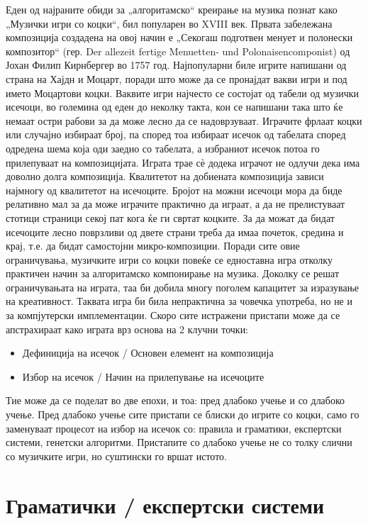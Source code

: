 Еден од најраните обиди за „алгоритамско“ креирање на музика познат како „Музички игри со коцки“, бил популарен во XVIII век. Првата забележана композиција создадена на овој начин е „Секогаш подготвен менует и полонески композитор“ (гер. Der allezeit fertige Menuetten- und Polonaisencomponist) од Јохан Филип Кирнбергер во 1757 год. Најпопуларни биле игрите напишани од страна на Хајдн и Моцарт, поради што може да се пронајдат вакви игри и под името Моцартови коцки. Ваквите игри најчесто се состојат од табели од музички исечоци, во големина од еден до неколку такта, кои се напишани така што ќе немаат остри рабови за да може лесно да се надоврзуваат. Играчите фрлаат коцки или случајно избираат број, па според тоа избираат исечок од табелата според одредена шема која оди заедно со табелата, а избраниот исечок потоа го прилепуваат на композицијата. Играта трае сѐ додека играчот не одлучи дека има доволно долга композиција. Квалитетот на добиената композиција зависи најмногу од квалитетот на исечоците. Бројот на можни исечоци мора да биде релативно мал за да може играчите практично да играат, а да не прелистуваат стотици страници секој пат кога ќе ги свртат коцките. За да можат да бидат исечоците лесно поврзливи од двете страни треба да имаа почеток, средина и крај, т.е. да бидат самостојни микро-композиции. Поради сите овие ограничувања, музичките игри со коцки повеќе се едноставна игра отколку практичен начин за алгоритамско компонирање на музика. Доколку се решат ограничувањата на играта, таа би добила многу поголем капацитет за изразување на креативност. Таквата игра би била непрактична за човечка употреба, но не и за компјутерски имплементации. Скоро сите истражени пристапи може да се апстрахираат како играта врз основа на 2 клучни точки:
\begin{itemize}
    \item Дефиниција на исечок / Основен елемент на композиција 
    \item Избор на исечок / Начин на прилепување на исечоците
\end{itemize}
Тие може да се поделат во две епохи, и тоа: пред длабоко учење и со длабоко учење. Пред длабоко учење сите пристапи се блиски до игрите со коцки, само го заменуваат процесот на избор на исечок со: правила и граматики, експертски системи, генетски алгоритми. Пристапите со длабоко учење не со толку слични со музичките игри, но суштински го вршат истото. 

\section{Граматички / експертски системи} 

